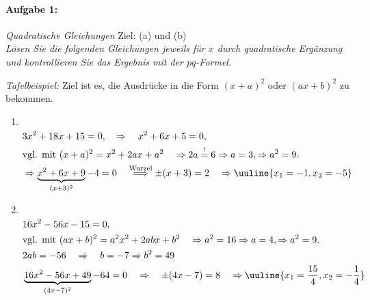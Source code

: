 
\paragraph{Aufgabe 1: } \emph{Quadratische Gleichungen} \hfill Ziel: (a) und (b)\\[0.2cm]
\emph{Lösen Sie die folgenden Gleichungen jeweils für $x$ durch quadratische Ergänzung und kontrollieren Sie das Ergebnis mit der $pq$-Formel.}

\emph{Tafelbeispiel: } Ziel ist es, die Ausdrücke in die Form $(x+a)^2$ oder $(ax+b)^2$ zu bekommen.
\begin{enumerate}
    \item$~$\\[-1.4cm]
    \begin{align}
        &3x^2 + 18x +15 = 0, \quad \Rightarrow\quad x^2 + 6x + 5 = 0,\\
        &\text{vgl. mit } (x+a)^2 = x^2 + 2ax + a^2 \quad \Rightarrow 2a \overset{!}{=} 6 \Rightarrow a=3, \Rightarrow a^2 = 9. \\
        &\Rightarrow \underbrace{x^2 + 6x + 9}_{(x+3)^2} -4 = 0 \quad \overset{\text{Wurzel}}{\Longrightarrow} \pm (x+3) = 2 \quad \Rightarrow \uuline{x_1 = -1, x_2 = -5} 
    \end{align}
    \item$~$\\[-1.4cm]
    \begin{align}
        &16x^2-56x-15 = 0,\\
        &\text{vgl. mit } (ax+b)^2 = a^2x^2 + 2abx + b^2 \quad \Rightarrow a^2 =16 \Rightarrow a=4, \Rightarrow a^2 = 9. \\
        &2ab = -56 \quad \Rightarrow \quad b=-7 \Rightarrow b^2 = 49\\
        &\underbrace{16x^2-56x+49}_{(4x-7)^2}-64 = 0 \quad \Rightarrow \quad \pm (4x-7) = 8 \quad \Rightarrow \uuline{x_1 = \frac{15}{4}, x_2 = -\frac{1}{4}}
    \end{align}
\end{enumerate}

